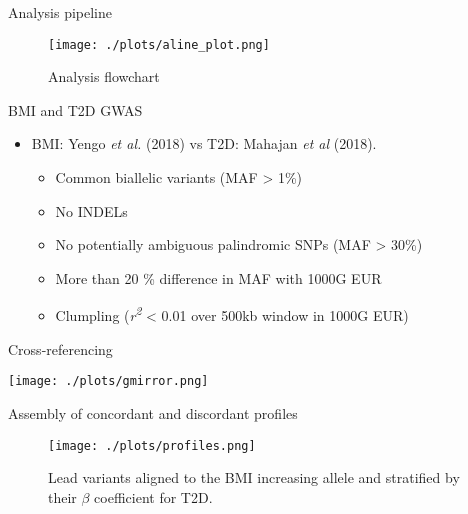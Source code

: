 \documentclass[presentation]{beamer}
\begin{document}
\begin{frame}[label={sec:org37950cb}]{Analysis pipeline}
\begin{figure}[htbp]
\centering
\texttt{[image: ./plots/aline\_plot.png]}
\caption{Analysis flowchart}
\end{figure}
\end{frame}
\begin{frame}[label={sec:org9d4be89}]{BMI and T2D GWAS}
\begin{itemize}
\item BMI: Yengo \emph{et al.} (2018) vs T2D: Mahajan \emph{et al} (2018).
\begin{itemize}
\item Common biallelic variants (MAF > 1\%)
\item No INDELs
\item No potentially ambiguous palindromic SNPs (MAF > 30\%)
\item More than 20 \% difference in MAF with 1000G EUR
\item Clumpling (\emph{r\textsuperscript{2}} < 0.01 over 500kb window in 1000G EUR)
\end{itemize}
\end{itemize}
\end{frame}
\begin{frame}[label={sec:org40ae64d}]{Cross-referencing}
\begin{center}
\texttt{[image: ./plots/gmirror.png]}
\end{center}
\end{frame}
\begin{frame}[label={sec:org55b8148}]{Assembly of concordant and discordant profiles}
\begin{figure}[htbp]
\centering
\texttt{[image: ./plots/profiles.png]}
\caption{Lead variants aligned to the BMI increasing allele and stratified by their \(\beta\) coefficient for T2D.}
\end{figure}
\end{frame}
\end{document}

